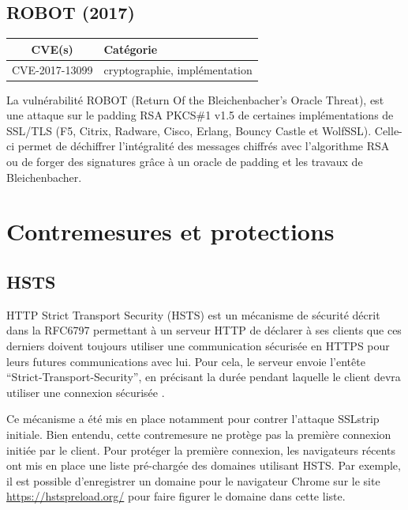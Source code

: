 

\subsection{ROBOT (2017)}

\begin{tabularx}{0.96\textwidth}{|c|X|}
  \hline
  \textbf{CVE(s)} & \textbf{Catégorie} \\
  \hline
  CVE-2017-13099 & cryptographie, implémentation \\
  \hline
\end{tabularx}

\vspace{1em}

La vulnérabilité ROBOT (Return Of the Bleichenbacher's Oracle Threat), est une attaque sur le padding RSA PKCS\#1 v1.5 de certaines implémentations de SSL/TLS (F5, Citrix, Radware, Cisco, Erlang, Bouncy Castle et WolfSSL). Celle-ci permet de déchiffrer l'intégralité des messages chiffrés avec l'algorithme RSA ou de forger des signatures grâce à un oracle de padding et les travaux de Bleichenbacher\cite{robot}.


\section{Contremesures et protections}

\subsection{HSTS}

\label{sec:hsts}

HTTP Strict Transport Security (HSTS) est un mécanisme de sécurité décrit dans la RFC6797 permettant à un serveur HTTP de déclarer à ses clients que ces derniers doivent toujours utiliser une communication sécurisée en HTTPS pour leurs futures communications avec lui. Pour cela, le serveur envoie l'entête ``Strict-Transport-Security'', en précisant la durée pendant laquelle le client devra utiliser une connexion sécurisée \cite{hsts}.

Ce mécanisme a été mis en place notamment pour contrer l'attaque SSLstrip initiale. Bien entendu, cette contremesure ne protège pas la première connexion initiée par le client. Pour protéger la première connexion, les navigateurs récents ont mis en place une liste pré-chargée des domaines utilisant HSTS. Par exemple, il est possible d'enregistrer un domaine pour le navigateur Chrome sur le site \url{https://hstspreload.org/} pour faire figurer le domaine dans cette liste.

